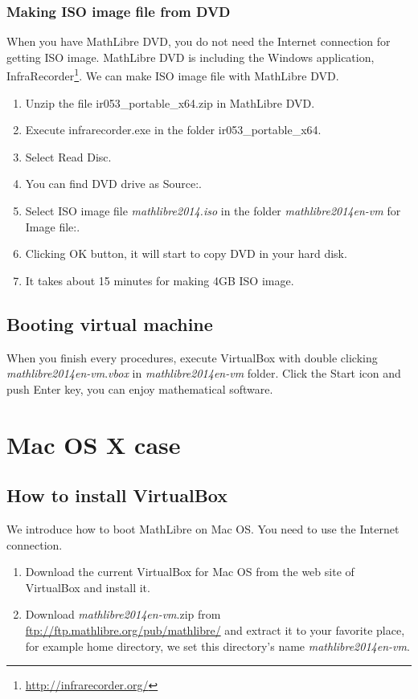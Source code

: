 \documentclass[a4]{article}
\newcommand{\ir}{ir053\_portable\_x64}
\newcommand{\vm}{{\em mathlibre2014en-vm}}
\begin{document}
\subsubsection{Making ISO image file from DVD}
When you have MathLibre DVD, 
you do not need the Internet connection for getting ISO image.
MathLibre DVD is including the Windows application, InfraRecorder\footnote{\url{http://infrarecorder.org/}}.
We can make ISO image file with MathLibre DVD.
\begin{enumerate}
 \item Unzip the file \ir.zip{} in MathLibre DVD.
 \item Execute infrarecorder.exe in the folder \ir.
 \item Select Read Disc.
 \item You can find DVD drive as Source:.
 \item Select ISO image file {\em mathlibre2014.iso} in the folder \vm{} for Image file:.
 \item Clicking OK button, it will start to copy DVD in your hard disk.
 \item It takes about 15 minutes for making 4GB ISO image.
\end{enumerate}

\subsection{Booting virtual machine}
When you finish every procedures,
execute VirtualBox with double clicking \vm.{\em vbox} in \vm{} folder.
Click the Start icon and push Enter key, you can enjoy mathematical software.

\section{Mac OS X case}
\subsection{How to install VirtualBox}
We introduce how to boot MathLibre on Mac OS.
You need to use the Internet connection.
\begin{enumerate}
 \item Download the current VirtualBox for Mac OS from the web site of VirtualBox and install it.
 \item Download \vm.zip{} from
       \url{ftp://ftp.mathlibre.org/pub/mathlibre/} and extract it to
       your favorite place, for example home directory, we set this
       directory's name \vm.
\end{enumerate}
\end{document}
